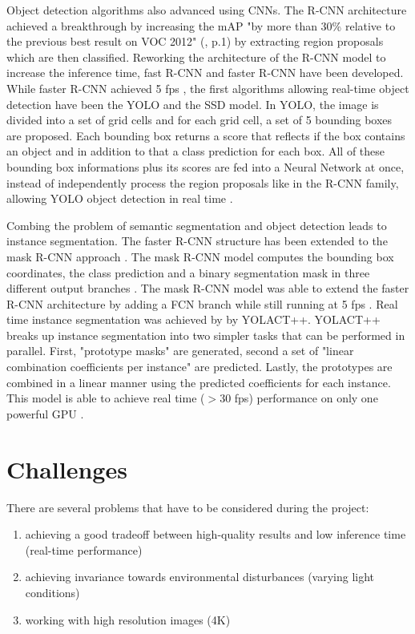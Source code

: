 \documentclass[11pt,
  paper=a4, 
  bibliography=totocnumbered,
	captions=tableheading,
	BCOR=10mm
]{scrreprt}
\theoremstyle{definition}
\begin{document}
Object detection algorithms also advanced using CNNs. 
The R-CNN architecture achieved a breakthrough by increasing the mAP "by more than 30\%
relative to the previous best result on VOC 2012" (\cite{Girshick2014}, p.1) by extracting region proposals which are then classified.
Reworking the architecture of the R-CNN model to increase the inference time, fast R-CNN \cite{Girshick2015} and faster R-CNN \cite{Ren2015} have been developed. 
While faster R-CNN achieved 5 fps \cite{Ren2015}, the first algorithms allowing real-time object detection have been the YOLO \cite{Redmon2016} and the SSD \cite{Liu2016} model.
In YOLO, the image is divided into a set of grid cells and for each grid cell, a set of 5 bounding boxes are proposed. 
Each bounding box returns a score that reflects if the box contains an object and in addition to that a class prediction for each box.
All of these bounding box informations plus its scores are fed into a Neural Network at once, instead of independently process the region proposals like in the R-CNN family, allowing YOLO object detection in real time \cite{Redmon2016}.

Combing the problem of semantic segmentation and object detection leads to instance segmentation.
The faster R-CNN structure has been extended to the mask R-CNN approach \cite{He2017}. 
The mask R-CNN model computes the bounding box coordinates, the class prediction and a binary segmentation mask in three different output branches \cite{Mittal2020}. 
The mask R-CNN model was able to extend the faster R-CNN architecture by adding a FCN branch while still running at 5 fps \cite{He2017}.
Real time instance segmentation was achieved by by YOLACT++. 
YOLACT++ breaks up instance segmentation into two simpler tasks that can be performed in parallel.
First, "prototype masks" are generated, second a set of "linear combination coefficients per instance" are predicted.
Lastly, the prototypes are combined in a linear manner using the predicted coefficients for each instance. 
This model is able to achieve real time ($>$30 fps) performance on only one powerful GPU \cite{Bolya2019}.

\section{Challenges}

There are several problems that have to be considered during the project:
\begin{enumerate}
	\item achieving a good tradeoff between high-quality results and low inference time (real-time performance)
	\item achieving invariance towards environmental disturbances (varying light conditions)
	\item working with high resolution images (4K)
\end{enumerate}
\end{document}
